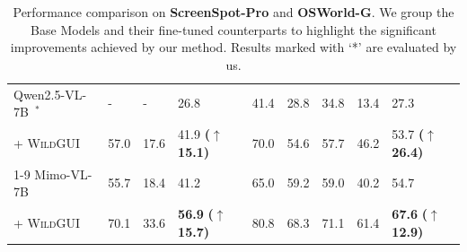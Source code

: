 \documentclass{llmxive}
\providecommand{\imp}[1]{\scriptsize\textbf{(\(\uparrow\)#1)}}
\providecommand{\ourdataset}{\textsc{WildGUI}\xspace}
\begin{document}
\begin{table}[ht]
{\begin{tabular}{lllllllll}
Qwen2.5-VL-7B~\citep{bai2025qwen2}$^*$ & - & - & 26.8 & 41.4 & 28.8 & 34.8 & 13.4 & 27.3\\
\quad + \ourdataset{} & 57.0 & 17.6 & 41.9 \imp{15.1} & 70.0  & 54.6 & 57.7 & 46.2  &  53.7 \imp{26.4} \\
\cmidrule(lr){1-9} %
Mimo-VL-7B~\citep{coreteam2025mimovltechnicalreport} & 55.7 & 18.4 & 41.2 & 65.0 & 59.2 & 59.0 & 40.2 & 54.7 \\
\quad + \ourdataset{} & 70.1 & 33.6 & \textbf{56.9} \imp{15.7} & 80.8 & 68.3 & 71.1 & 61.4 & \textbf{67.6} \imp{12.9}\\
\bottomrule
\end{tabular}
}
\label{tab: grounding benchmark}
\caption{Performance comparison on \textbf{ScreenSpot-Pro} and \textbf{OSWorld-G}. We group the Base Models and their fine-tuned counterparts to highlight the significant improvements achieved by our method. Results marked with `*' are evaluated by us.}
\end{table}




\end{document}
